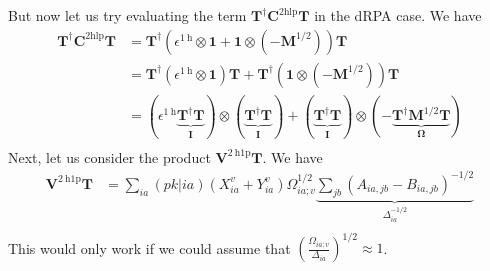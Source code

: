 But now let us try evaluating the term $\bm{T}^\dagger \bm{C}^{2 \mathrm{hlp}} \bm{T }$ in the dRPA case. We have
\begin{align}
    \bm{T}^\dagger \bm{C}^{2 \mathrm{hlp}} \bm{T } &= \bm{T}^\dagger \left(\epsilon^{1 \mathrm{~h}} \otimes \bm{1} + \bm{1} \otimes (-\bm{M}^{1/2})\right) \bm{T } \\
&= \bm{T}^\dagger \left(\epsilon^{1 \mathrm{~h}} \otimes \bm{1}\right) \bm{T } + \bm{T}^\dagger \left(\bm{1} \otimes (-\bm{M}^{1/2})\right) \bm{T } \\
&= \left(\epsilon^{1 \mathrm{~h}} \underbrace{\bm{T}^\dag \bm{T}}_{\bm{\bm{I}}} \right) \otimes \left(\underbrace{\bm{T}^\dag \bm{T}}_{\bm{\bm{I}}}\right) + \left(\underbrace{\bm{T}^\dag \bm{T}}_{\bm{\bm{I}}}\right) \otimes (-\underbrace{\bm{T}^\dag \bm{M}^{1/2} \bm{T}}_{\bm{\Omega }}) \\
\end{align}
Next, let us consider the product $\bm{V}^{2 \mathrm{~h} 1 \mathrm{p}} \bm{T }$. We have
\begin{align}
    \bm{V}^{2 \mathrm{~h} 1 \mathrm{p}} \bm{T } &= \sum_{ia} (pk|ia) \left( X_{ia}^{v} + Y_{ia}^{v} \right) \Omega_{ia;v}^{1/2} \underbrace{\sum_{jb} \left(A_{ia,jb} - B_{ia,jb}\right)^{-1/2}}_{\Delta _{ia}^{-1/2}} \\
\end{align}
This would only work if we could assume that $\left(\frac{\Omega _{ia;v}}{\Delta _{ia}}\right)^{1/2} \approx 1$. 
